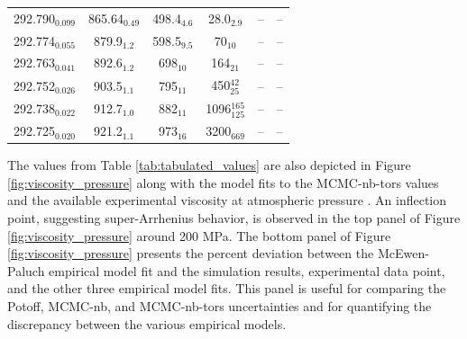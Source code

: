 \documentclass[preprint,review,12pt]{elsarticle}
\begin{document}
\begin{table}[htb!]
\begin{center}
\begin{tabular}{|c|c|c|c|c|c|}
				292.790$_{0.099}$ & 	865.64$_{0.49}$ & 	498.4$_{4.6}$ & 	28.0$_{2.9}$ & 	-- & 	-- \\
				292.774$_{0.055}$ & 	879.9$_{1.2}$ & 	598.5$_{9.5}$ & 	70$_{10}$ & 	-- & 	-- \\
				292.763$_{0.041}$ & 	892.6$_{1.2}$ & 	698$_{10}$ & 	164$_{21}$ & 	-- & 	-- \\
				292.752$_{0.026}$ & 	903.5$_{1.1}$ & 	795$_{11}$ & 	450$^{42}_{25}$ & 	-- & 	-- \\
				292.738$_{0.022}$ & 	912.7$_{1.0}$ & 	882$_{11}$ & 	1096$^{165}_{125}$ & 	-- & 	-- \\
				292.725$_{0.020}$ & 	921.2$_{1.1}$ & 	973$_{16}$ & 	3200$_{669}$ & 	-- & 	-- \\
				\hline
			\end{tabular}
		\end{center} 
	\end{table}
	
	The values from Table \ref{tab:tabulated_values} are also depicted in Figure \ref{fig:viscosity_pressure} along with the model fits to the MCMC-nb-tors values and the available experimental viscosity at atmospheric pressure \cite{TDE}. An inflection point, suggesting super-Arrhenius behavior, is observed in the top panel of Figure \ref{fig:viscosity_pressure} around 200 MPa. The bottom panel of Figure \ref{fig:viscosity_pressure} presents the percent deviation between the McEwen-Paluch empirical model fit and the simulation results, experimental data point, and the other three empirical model fits. This panel is useful for comparing the Potoff, MCMC-nb, and MCMC-nb-tors uncertainties and for quantifying the discrepancy between the various empirical models.
	
\end{document}
